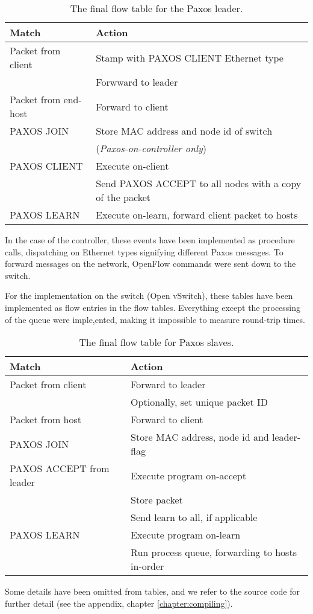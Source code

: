 \begin{table}[H]
  \centering
  \begin{tabular}{|l|l|}
    \hline \textbf{Match} & \textbf{Action} \\
    \hline Packet from client & Stamp with PAXOS CLIENT Ethernet type \\
                       & Forwward to leader \\
    \hline Packet from end-host & Forward to client \\
    \hline PAXOS JOIN  & Store MAC address and node id of switch \\
                       & (\textit{Paxos-on-controller only}) \\
    \hline PAXOS CLIENT & Execute on-client \\
                        & Send PAXOS ACCEPT to all nodes with a copy of the
                        packet \\
    \hline PAXOS LEARN & Execute on-learn, forward client packet to hosts  \\
    \hline
  \end{tabular}
  \caption{The final flow table for the Paxos leader.}
  \label{table:complete.match.leader}
\end{table}

In the case of the controller, these events have been implemented as
procedure calls, dispatching on Ethernet types signifying different Paxos
messages.  To forward messages on the network, OpenFlow commands were sent
down to the switch.

For the implementation on the switch (Open vSwitch), these tables have been
implemented as flow entries in the flow tables.  Everything except the
processing of the queue were imple,ented, making it impossible to measure
round-trip times.

\begin{table}[H]
  \centering
  \begin{tabular}{|l|l|}
    \hline \textbf{Match} & \textbf{Action} \\
    \hline Packet from client & Forward to leader \\
                       & Optionally, set unique packet ID \\
    \hline Packet from host & Forward to client  \\
    \hline PAXOS JOIN & Store MAC address, node id and leader-flag \\
    \hline PAXOS ACCEPT from leader & Execute program on-accept \\
                                    & Store packet \\
                                    & Send learn to all, if applicable \\
    \hline PAXOS LEARN & Execute program on-learn \\
                       & Run process queue, forwarding to hosts in-order \\
    \hline
  \end{tabular}
  \caption{The final flow table for Paxos slaves.}
  \label{table:complete.match.slave}
\end{table}

Some details have been omitted from tables, and we refer to the source code
for further detail (see the appendix, chapter \ref{chapter:compiling}).


